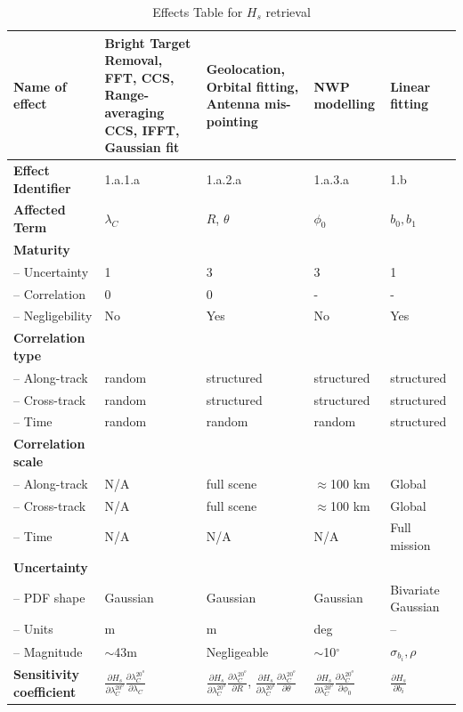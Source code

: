 \begin{table}[h]
		\centering
		\scriptsize %
		\setlength{\tabcolsep}{2pt} %
		\caption{Effects Table for $H_s$ retrieval}
		
		\begin{tabularx}{\textwidth}{l | X | X | X | X}
			\toprule
			\textbf{Name of effect} & Bright Target Removal, FFT, CCS, Range-averaging CCS, IFFT, Gaussian fit & Geolocation, Orbital fitting, Antenna mis-pointing & NWP modelling & Linear fitting \\
			\midrule
			\textbf{Effect Identifier} & 1.a.1.a & 1.a.2.a & 1.a.3.a & 1.b \\
			\midrule
			\textbf{Affected Term} & $\lambda_C$ & $R$, $\theta$ & $\phi_{0}$ & $b_0, b_1$ \\
			\midrule
			\textbf{Maturity} &  &  &  &  \\
			\quad -- Uncertainty & 1 & 3 & 3 & 1 \\
			\quad -- Correlation & 0 & 0 & - & - \\
			\quad -- Negligebility & No & Yes & No & Yes \\
			\midrule
			\textbf{Correlation type} &  &  &  &  \\
			\quad -- Along-track & random & structured & structured & structured \\
			\quad -- Cross-track & random & structured & structured & structured \\
			\quad -- Time & random & random & random & structured \\
			\midrule
			\textbf{Correlation scale} &  &  &  &  \\
			\quad -- Along-track & N/A & full scene & $\approx$100 km & Global \\
			\quad -- Cross-track & N/A & full scene & $\approx$100 km & Global \\
			\quad -- Time & N/A & N/A & N/A & Full mission \\
			\midrule
			\textbf{Uncertainty} & & & & \\
			\quad -- PDF shape & Gaussian & Gaussian & Gaussian & Bivariate \newline Gaussian \\
			\quad -- Units & m & m & deg & -- \\
			\quad -- Magnitude & $\sim$43m & Negligeable & $\sim$10$^\circ$ & $\sigma_{b_i}, \rho$ \\
			\midrule
			\textbf{Sensitivity coefficient} & $\frac{\partial H_s}{\partial \lambda_C^{20^{o}}} \frac{\partial \lambda_C^{20^{o}}}{\partial \lambda_C}$ & $\frac{\partial H_s}{\partial \lambda_C^{20^{o}}} \frac{\partial \lambda_C^{20^{o}}}{\partial R}$, $\frac{\partial H_s}{\partial \lambda_C^{20^{o}}} \frac{\partial \lambda_C^{20^{o}}}{\partial \theta}$ & $\frac{\partial H_s}{\partial \lambda_C^{20^{o}}} \frac{\partial \lambda_C^{20^{o}}}{\partial \phi_0}$ & $\frac{\partial H_s}{\partial b_i}$ \\
			\bottomrule
		\end{tabularx}
        \label{tab: effects Hs}
	\end{table}


